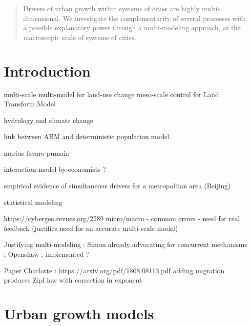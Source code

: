 \documentclass[alpha-refs]{wiley-article}
\begin{document}
\begin{abstract}
Drivers of urban growth within systems of cities are highly multi-dimensional. We investigate the complementarity of several processes with a possible explanatory power through a multi-modeling approach, at the macroscopic scale of systems of cities.

\end{abstract}




\section{Introduction}




\cite{verburg2008multi} multi-scale multi-model for land-use change
\cite{tayyebi2013hierarchical} meso-scale control for Land Transform Model %

\cite{wiley2010multi} hydrology and climate change


\cite{2018arXiv180404913C} link between ABM and deterministic population model

\cite{cottineau2015modular} marius 
\cite{favaro2011gibrat} favaro-pumain

\cite{hsieh2015housing} interaction model by economists ?


\cite{li2013forty} empirical evidence of simultaneous drivers for a metropolitan area (Beijing)

\cite{nong2011urban} statistical modeling



https://cybergeo.revues.org/2289 micro/macro - common errors - need for real feedback (justifies need for an accurate multi-scale model)



Justifying multi-modeling : Simon already advocating for concurrent mechanisms \cite{simon1968judging} ; Openshaw \cite{openshaw1983data} ; \cite{turton1997genetic} implemented ?

Paper Charlotte : https://arxiv.org/pdf/1808.08113.pdf adding migration produces Zipf law with correction in exponent



\section{Urban growth models}
\end{document}

